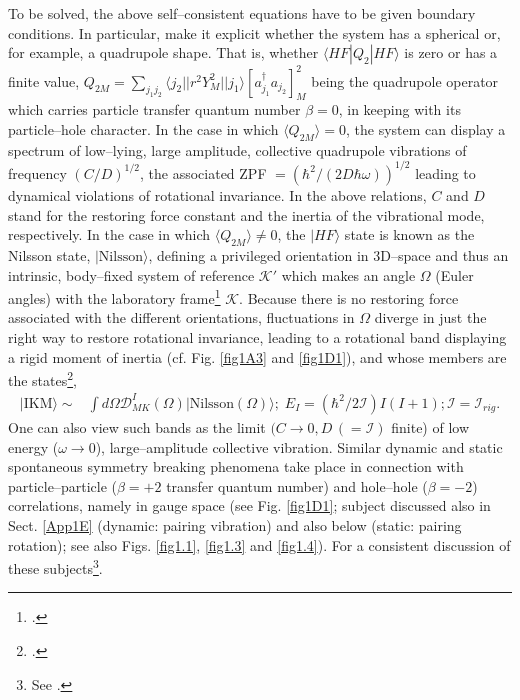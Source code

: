 To be solved, the above self--consistent equations have to be given boundary conditions. In particular, make it explicit whether the system has a spherical or, for example, a quadrupole  shape.   That is, whether $\langle HF|Q_2|HF\rangle$ is zero or has a finite value, $Q_{2M}=\sum_{j_1j_2}\langle j_2||r^2Y^2_M||j_1\rangle \left[a^\dagger_{j_1}a_{j_2}\right]^2_M$ being the quadrupole operator which carries particle transfer quantum number $\beta=0$, in keeping with its particle--hole character. In the case in which $\langle Q_{2M}\rangle=0$, the system can display a spectrum of low--lying, large amplitude, collective quadrupole vibrations of frequency $(C/D)^{1/2}$, the associated ZPF $=\left(\hbar^2/(2D\hbar\omega)\right)^{1/2}$ leading to dynamical violations of rotational invariance. In the above relations, $C$ and $D$ stand for the restoring force constant and the inertia of the vibrational mode, respectively. In the case in which $\langle Q_{2M}\rangle\neq0$, the $|HF\rangle$ state is known as the Nilsson state, $|\text{Nilsson}\rangle$, defining a privileged orientation in 3D--space and thus an intrinsic, body--fixed system of reference $\mathcal{K}'$ which makes an angle $\Omega$ (Euler angles) with the laboratory frame\footnote{\cite{Nilsson:55}.} $\mathcal{K}$. Because there is no restoring force associated with the different orientations, fluctuations in $\Omega$ diverge in just the right way to restore rotational invariance, leading to a rotational band displaying a rigid moment of inertia (cf. Fig. \ref{fig1A3} and \ref{fig1D1}), and whose members are the states\footnote{\cite{Bohr:75}.},
 \begin{equation*}
\begin{split}
|\text{IKM}\rangle\sim&\int d\Omega \mathcal{D}_{MK}^I(\Omega)|\text{Nilsson}(\Omega)\rangle;\; E_I=(\hbar^2/2\mathcal I)I(I+1); \mathcal{I}=\mathcal{I}_{rig}.
\end{split}
\end{equation*}
One can also view such bands as the limit $(C\rightarrow 0, D\,(=\mathcal I)$ finite) of low energy ($\omega\rightarrow 0$), large--amplitude collective vibration. 
Similar dynamic and static spontaneous symmetry breaking phenomena take place in connection with particle--particle ($\beta=+2$ transfer quantum number) and hole--hole ($\beta=-2$) correlations, namely in gauge space (see Fig. \ref{fig1D1}; subject discussed also in Sect. \ref{App1E} (dynamic: pairing vibration) and also below (static: pairing rotation); see also Figs. \ref{fig1.1}, \ref{fig1.3} and \ref{fig1.4}). For a consistent discussion of these subjects\footnote{See \cite{Bes:90}.}.




